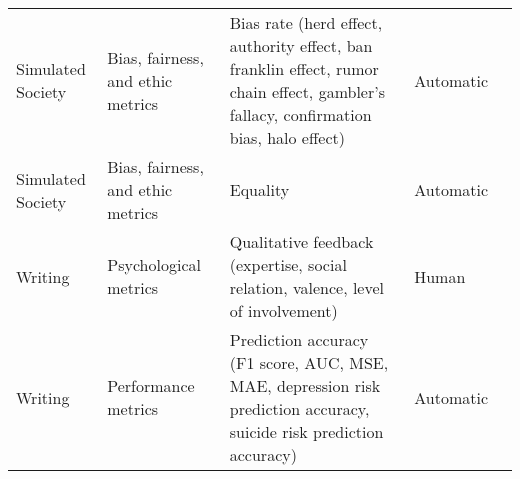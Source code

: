 \begin{small}
\begin{center}
\begin{longtable}{@{}p{}p{}p{}p{}p{}@{}}
Simulated Society        & Bias, fairness, and ethic metrics   & Bias rate (herd effect, authority effect, ban franklin effect, rumor chain effect, gambler's fallacy, confirmation bias, halo effect)                                                                       & Automatic & \cite{liu2025exploringprosocialirrationalityllm}                                                                                                                                                                                                                                                                                                                                                                                            \\
Simulated Society        & Bias, fairness, and ethic metrics   & Equality                                                                                                                                                                                                    & Automatic & \cite{piatti2024cooperatecollapseemergencesustainable}                                                                                                                                                                                                                                                                                                                                                                                                  \\
Writing                  & Psychological metrics & Qualitative feedback (expertise, social relation, valence, level of involvement)                                                                                                                            & Human     & \cite{10.1145/3613904.3642406}                                                                                                                                                                                                                                                                                                                                                                                \\
Writing                  & Performance metrics                 & Prediction accuracy (F1 score, AUC, MSE, MAE, depression risk prediction accuracy, suicide risk prediction accuracy)                                                                                        & Automatic & \cite{wang-etal-2024-unleashing}                                                                         \\

\end{longtable}
\end{center}
\end{small}
